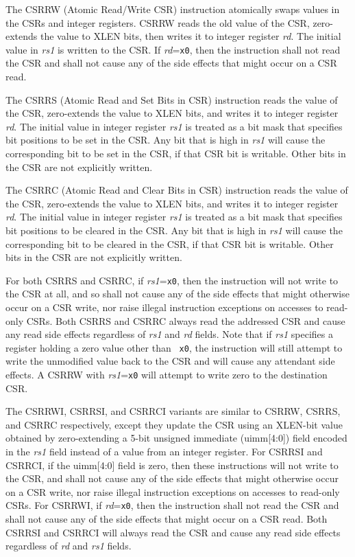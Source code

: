 The CSRRW (Atomic Read/Write CSR) instruction atomically swaps values
in the CSRs and integer registers. CSRRW reads the old value of the
CSR, zero-extends the value to XLEN bits, then writes it to integer
register {\em rd}.  The initial value in {\em rs1} is written to the
CSR.  If {\em rd}={\tt x0}, then the instruction shall not read the CSR
and shall not cause any of the side effects that might occur on a CSR
read.

The CSRRS (Atomic Read and Set Bits in CSR) instruction reads the
value of the CSR, zero-extends the value to XLEN bits, and writes it
to integer register {\em rd}.  The initial value in integer register
{\em rs1} is treated as a bit mask that specifies bit positions to be
set in the CSR.  Any bit that is high in {\em rs1} will cause the
corresponding bit to be set in the CSR, if that CSR bit is writable.
Other bits in the CSR are not explicitly written.

The CSRRC (Atomic Read and Clear Bits in CSR) instruction reads the
value of the CSR, zero-extends the value to XLEN bits, and writes it
to integer register {\em rd}.  The initial value in integer register
{\em rs1} is treated as a bit mask that specifies bit positions to be
cleared in the CSR.  Any bit that is high in {\em rs1} will cause the
corresponding bit to be cleared in the CSR, if that CSR bit is writable.
Other bits in the CSR are not explicitly written.

For both CSRRS and CSRRC, if {\em rs1}={\tt x0}, then the instruction
will not write to the CSR at all, and so shall not cause any of the
side effects that might otherwise occur on a CSR write, nor
raise illegal instruction exceptions on accesses to read-only CSRs.
Both CSRRS and CSRRC always read the addressed CSR and cause any read
side effects regardless of {\em rs1} and {\em rd} fields.  Note that
if {\em rs1} specifies a register holding a zero value other than {\tt
  x0}, the instruction will still attempt to write the unmodified
value back to the CSR and will cause any attendant side effects.  A
CSRRW with {\em rs1}={\tt x0} will attempt to write zero to the
destination CSR.

The CSRRWI, CSRRSI, and CSRRCI variants are similar to CSRRW, CSRRS,
and CSRRC respectively, except they update the CSR using an XLEN-bit
value obtained by zero-extending a 5-bit unsigned immediate (uimm[4:0]) field
encoded in the {\em rs1} field instead of a value from an integer
register.  For CSRRSI and CSRRCI, if the uimm[4:0] field is zero, then
these instructions will not write to the CSR, and shall not cause any
of the side effects that might otherwise occur on a CSR write, nor raise
illegal instruction exceptions on accesses to read-only CSRs.
For CSRRWI, if {\em rd}={\tt x0}, then the instruction shall not read the
CSR and shall not cause any of the side effects that might occur on a
CSR read.  Both CSRRSI and CSRRCI will always read the CSR and cause
any read side effects regardless of {\em rd} and {\em rs1} fields.

